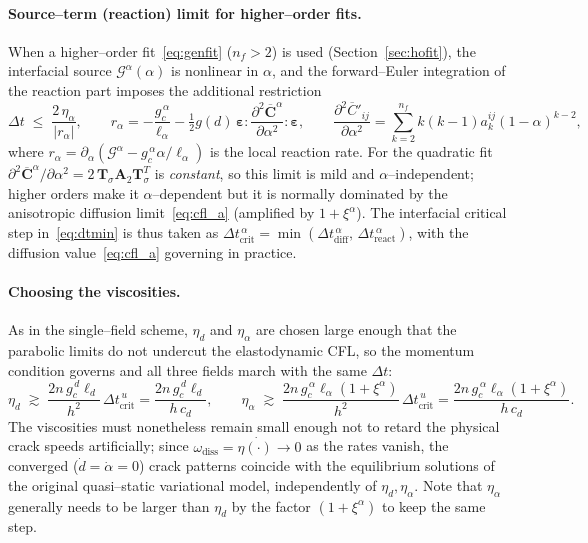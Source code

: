 \documentclass[12pt,a4paper]{article}
\newcommand{\beps}{\boldsymbol{\varepsilon}}
\newcommand{\Ca}{\overline{\mathbf{C}}^{\alpha}}     %
\newcommand{\Tsig}{\mathbf{T}_{\!\sigma}}            %
\newcommand{\Dt}{\Delta t}
\begin{document}
	\paragraph{Source--term (reaction) limit for higher--order fits.}
	When a higher--order fit~\eqref{eq:genfit} ($n_f>2$) is used
	(Section~\ref{sec:hofit}), the interfacial source $\mathcal G^{\alpha}(\alpha)$
	is nonlinear in $\alpha$, and the forward--Euler integration of the reaction part
	imposes the additional restriction
	\begin{equation}\label{eq:cfl_react}
		\Dt \;\le\; \frac{2\,\eta_\alpha}{|r_\alpha|},
		\qquad
		r_\alpha = -\frac{g_c^{\,\alpha}}{\ell_\alpha}
		- \tfrac12 g(d)\,\beps:\frac{\partial^2\Ca}{\partial\alpha^2}:\beps,
		\qquad
		\frac{\partial^2\overline C'_{ij}}{\partial\alpha^2}=\sum_{k=2}^{n_f}k(k-1)a_k^{ij}(1-\alpha)^{k-2},
	\end{equation}
	where $r_\alpha=\partial_\alpha(\mathcal G^{\alpha}-g_c^{\,\alpha}\alpha/\ell_\alpha)$
	is the local reaction rate. For the quadratic fit
	$\partial^2\Ca/\partial\alpha^2=2\,\Tsig\mathbf A_2\Tsig^{T}$ is \emph{constant},
	so this limit is mild and $\alpha$--independent; higher orders make it
	$\alpha$--dependent but it is normally dominated by the anisotropic diffusion
	limit~\eqref{eq:cfl_a} (amplified by $1+\xi^{\alpha}$). The interfacial critical
	step in~\eqref{eq:dtmin} is thus taken as
	$\Dt^{\,\alpha}_{\mathrm{crit}}=\min(\Dt^{\,\alpha}_{\mathrm{diff}},\,\Dt^{\,\alpha}_{\mathrm{react}})$,
	with the diffusion value~\eqref{eq:cfl_a} governing in practice.

	\paragraph{Choosing the viscosities.}
	As in the single--field scheme, $\eta_d$ and $\eta_\alpha$ are chosen large
	enough that the parabolic limits do not undercut the elastodynamic CFL, so the
	momentum condition governs and all three fields march with the same $\Dt$:
	\begin{equation}\label{eq:eta_choice}
		\eta_d \;\gtrsim\; \frac{2n\,g_c^{\,d}\ell_d}{h^2}\,\Dt^{\,u}_{\mathrm{crit}}
		= \frac{2n\,g_c^{\,d}\ell_d}{h\,c_d},
		\qquad
		\eta_\alpha \;\gtrsim\; \frac{2n\,g_c^{\,\alpha}\ell_\alpha(1+\xi^{\alpha})}{h^2}\,\Dt^{\,u}_{\mathrm{crit}}
		= \frac{2n\,g_c^{\,\alpha}\ell_\alpha(1+\xi^{\alpha})}{h\,c_d}.
	\end{equation}
	The viscosities must nonetheless remain small enough not to retard the physical
	crack speeds artificially; since $\omega_{\mathrm{diss}}=\eta\dot{(\cdot)}\to0$ as
	the rates vanish, the converged ($\dot d=\dot\alpha=0$) crack patterns coincide
	with the equilibrium solutions of the original quasi--static variational model,
	independently of $\eta_d,\eta_\alpha$. Note that $\eta_\alpha$ generally needs to
	be larger than $\eta_d$ by the factor $(1+\xi^{\alpha})$ to keep the same step.
\end{document}
